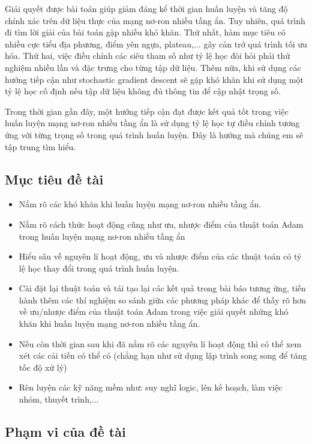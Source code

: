 \documentclass{article}[14pt]
\begin{document}
{   Giải quyết được bài toán giúp giảm đáng kể thời gian huấn luyện và tăng độ chính xác trên dữ liệu thực của mạng nơ-ron nhiều tầng ẩn. Tuy nhiên, quá trình đi tìm lời giải của bài toán gặp nhiều khó khăn. Thứ nhất, hàm mục tiêu có nhiều cực tiểu địa phương, điểm yên ngựa, plateau,... gây cản trở quá trình tối ưu hóa. Thứ hai, việc điều chỉnh các siêu tham số như tỷ lệ học đòi hỏi phải thử nghiệm nhiều lần và đặc trưng cho từng tập dữ liệu. Thêm nữa, khi sử dụng các hướng tiếp cận như stochastic gradient descent sẽ gặp khó khăn khi sử dụng một tỷ lệ học cố định nếu tập dữ liệu không đủ thông tin để cập nhật trọng số.
   
   Trong thời gian gần đây, một hướng tiếp cận đạt được kết quả tốt trong việc huấn luyện mạng nơ-ron nhiều tầng ẩn là sử dụng tỷ lệ học tự điều chỉnh tương ứng với từng trọng số trong quá trình huấn luyện. Đây là hướng mà chúng em sẽ tập trung tìm hiểu.
    
    \subsection{Mục tiêu đề tài}
    
    \begin{itemize}
        \item Nắm rõ các khó khăn khi huấn luyện mạng nơ-ron nhiều tầng ẩn.
        \item Nắm rõ cách thức hoạt động cũng như ưu, nhược điểm của thuật toán Adam trong huấn luyện mạng nơ-ron nhiều tầng ẩn
        \item Hiểu sâu về nguyên lí hoạt động, ưu và nhược điểm của các thuật toán có tỷ lệ học thay đổi trong quá trình huấn luyện.
        \item Cài đặt lại thuật toán và tái tạo lại các kết quả trong bài báo tương ứng, tiến hành thêm các thí nghiệm so sánh giữa các phương pháp khác để thấy rõ hơn về ưu/nhược điểm của thuật toán Adam trong việc giải quyết những khó khăn khi huấn luyện mạng nơ-ron nhiều tầng ẩn.
        \item Nếu còn thời gian sau khi đã nắm rõ các nguyên lí hoạt động thì có thể xem xét các cải tiến có thể có (chẳng hạn như sử dụng lập trình song song để tăng tốc độ xử lý)
        \item Rèn luyện các kỹ năng mềm như: suy nghĩ logic, lên kế hoạch, làm việc nhóm, thuyết trình,...
    \end{itemize}
    
    \subsection{Phạm vi của đề tài}
    
}
\end{document}
